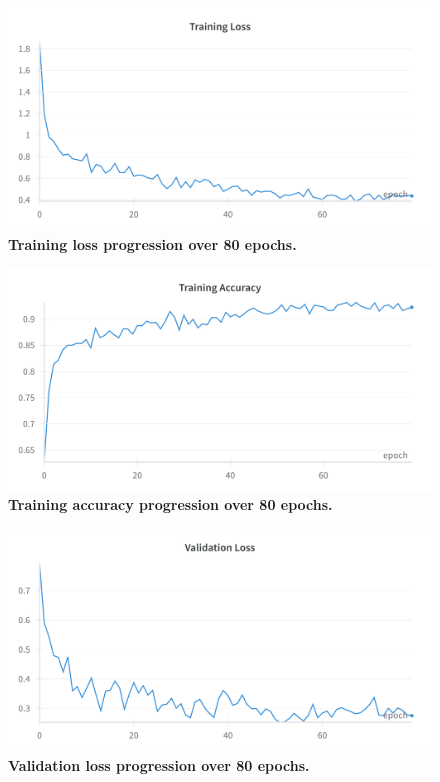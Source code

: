 \documentclass[twocolumn,a4paper]{article}
\begin{document}
\begin{figure}[H]
\centering
\includegraphics[width=0.95\linewidth]{figs/train_loss}
\caption{\textbf{Training loss progression over 80 epochs.}}
\label{fig:trainloss}
\end{figure}

\begin{figure}[H]
\centering
\includegraphics[width=0.95\linewidth]{figs/train_acc}
\caption{\textbf{Training accuracy progression over 80 epochs.}}
\label{fig:trainacc}
\end{figure}

\begin{figure}[H]
\centering
\includegraphics[width=0.95\linewidth]{figs/val_loss}
\caption{\textbf{Validation loss progression over 80 epochs.}}
\label{fig:valloss}
\end{figure}
\end{document}
